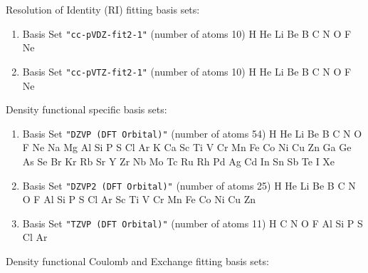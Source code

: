 Resolution of Identity (RI) fitting basis sets:

\begin{enumerate}

\item Basis Set \verb#"cc-pVDZ-fit2-1"# (number of atoms 10)  \newline 
  H He Li Be B C N O F Ne


\item Basis Set \verb#"cc-pVTZ-fit2-1"# (number of atoms 10)  \newline 
  H He Li Be B C N O F Ne

\end{enumerate}

Density functional specific basis sets:

\begin{enumerate}

\item Basis Set \verb#"DZVP (DFT Orbital)"# (number of atoms 54)  \newline
  H He Li Be B C N O F Ne Na Mg Al Si P S Cl Ar K Ca Sc Ti V Cr Mn
 Fe Co Ni Cu Zn Ga Ge As Se Br Kr Rb Sr Y Zr Nb Mo Tc Ru Rh Pd Ag Cd In Sn
 Sb Te I Xe

\item Basis Set \verb#"DZVP2 (DFT Orbital)"# (number of atoms 25)  \newline
  H He Li Be B C N O F Al Si P S Cl Ar Sc Ti V Cr Mn Fe Co Ni Cu Zn

\item Basis Set \verb#"TZVP (DFT Orbital)"# (number of atoms 11)  \newline
  H C N O F Al Si P S Cl Ar

\end{enumerate}

Density functional Coulomb and Exchange fitting basis sets:

